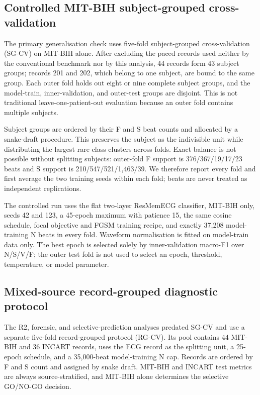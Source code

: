 \documentclass[review,12pt]{elsarticle}
\begin{document}
\subsection{Controlled MIT-BIH subject-grouped cross-validation}
\label{sec:sgcv}
The primary generalisation check uses five-fold subject-grouped cross-validation
(SG-CV) on MIT-BIH alone. After excluding the paced records used neither by the
conventional benchmark nor by this analysis, 44 records form 43 subject groups;
records 201 and 202, which belong to one subject, are bound to the same group.
Each outer fold holds out eight or nine complete subject groups, and the
model-train, inner-validation, and outer-test groups are disjoint. This is not
traditional leave-one-patient-out evaluation because an outer fold contains
multiple subjects.

Subject groups are ordered by their F and S beat counts and allocated by a
snake-draft procedure. This preserves the subject as the indivisible unit while
distributing the largest rare-class clusters across folds. Exact balance is not
possible without splitting subjects: outer-fold F support is
376/367/19/17/23 beats and S support is 210/547/521/1,463/39. We therefore
report every fold and first average the two training seeds within each fold;
beats are never treated as independent replications.

The controlled run uses the flat two-layer ResMemECG classifier, MIT-BIH only,
seeds 42 and 123, a 45-epoch maximum with patience 15, the same cosine schedule,
focal objective and FGSM training recipe, and exactly 37,208 model-training N
beats in every fold. Waveform normalisation is fitted on model-train data only.
The best epoch is selected solely by inner-validation macro-F1 over N/S/V/F;
the outer test fold is not used to select an epoch, threshold, temperature, or
model parameter.

\subsection{Mixed-source record-grouped diagnostic protocol}
\label{sec:rgcv}
The R2, forensic, and selective-prediction analyses predated SG-CV and use a
separate five-fold record-grouped protocol (RG-CV). Its pool contains 44
MIT-BIH and 36 INCART records, uses the ECG record as the splitting unit, a
25-epoch schedule, and a 35,000-beat model-training N cap. Records are ordered
by F and S count and assigned by snake draft. MIT-BIH and INCART test metrics
are always source-stratified, and MIT-BIH alone determines the selective
GO/NO-GO decision.
\end{document}
